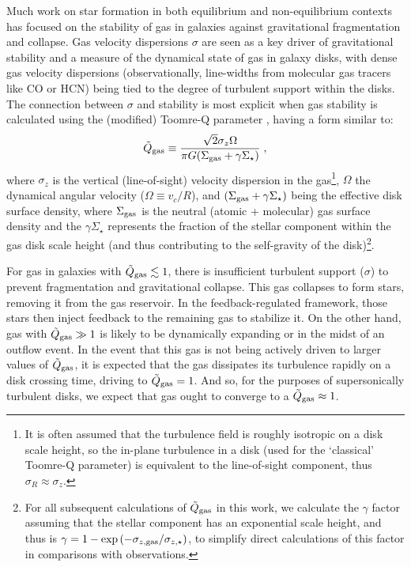 \documentclass[usletter,fleqn,usenatbib]{mnras}
\newcommand{\be}{\begin{equation}}
\newcommand{\ee}{\end{equation}}
\begin{document}
Much work on star formation in both equilibrium and non-equilibrium contexts has focused on the stability of gas in galaxies against gravitational fragmentation and collapse.  Gas velocity dispersions $\sigma$ are seen as a key driver of gravitational stability and a measure of the dynamical state of gas in galaxy disks, with dense gas velocity dispersions (observationally, line-widths from molecular gas tracers like CO or HCN) being tied to the degree of turbulent support within the disks.  The connection between $\sigma$ and stability is most explicit when gas stability is calculated using the (modified) Toomre-Q parameter \citep{Toomre1964}, having a form similar to:
\be \label{eq:Q}
\tilde Q_{\rm gas} \equiv  \frac{\sqrt{2}\sigma_z \Omega}{\pi G (\Sigma_{\rm gas} + \gamma\Sigma_\star)} \; , 
\ee
where $\sigma_z$ is the vertical (line-of-sight) velocity dispersion in the gas\footnote{It is often assumed that the turbulence field is roughly isotropic on a disk scale height, so the in-plane turbulence in a disk (used for the `classical' Toomre-Q parameter) is equivalent to the line-of-sight component, thus $\sigma_R \approx \sigma_z$.}, $\Omega$ the dynamical angular velocity ($\Omega \equiv v_c/R$), and $ (\Sigma_{\rm gas} + \gamma\Sigma_\star)$ being the effective disk surface density, where $\Sigma_{\rm gas}$ is the neutral (atomic + molecular) gas surface density and the $\gamma \Sigma_\star$ represents the fraction of the stellar component within the gas disk scale height (and thus contributing to the self-gravity of the disk)\footnote{For all subsequent calculations of $\tilde Q_{\rm gas}$ in this work, we calculate the $\gamma$ factor assuming that the stellar component has an exponential scale height, and thus is $\gamma = 1 -\exp{(-\sigma_{z,{\rm gas}}/\sigma_{z,\star})}$, to simplify direct calculations of this factor in comparisons with observations.}.    

For gas in galaxies with $\tilde Q_{\rm gas} \lesssim 1$, there is insufficient turbulent support ($\sigma$) to prevent fragmentation and gravitational collapse.  This gas collapses to form stars, removing it from the gas reservoir.  In the feedback-regulated framework, those stars then inject feedback to the remaining gas to stabilize it.  On the other hand, gas with $\tilde Q_{\rm gas} \gg 1$ is likely to be dynamically expanding or in the midst of an outflow event.  In the event that this gas is not being actively driven to larger values of $\tilde Q_{\rm gas}$, it is expected that the gas dissipates its turbulence rapidly on a disk crossing time, driving to $\tilde Q_{\rm gas} = 1$.  And so, for the purposes of supersonically turbulent disks, we expect that gas ought to converge to a $\tilde Q_{\rm gas} \approx 1$.
\end{document}
